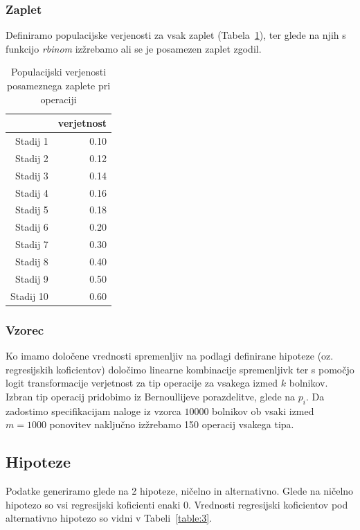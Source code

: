 \documentclass[letterpaper,11pt]{article}
\begin{document}
\subsubsection{Zaplet}
Definiramo populacijske verjenosti za vsak zaplet (Tabela~\ref{table:2}), ter glede na njih s funkcijo \emph{rbinom} izžrebamo ali se je posamezen zaplet zgodil.

\begin{table}[ht]
\centering
\begin{tabular}{rr}
  \hline
 & verjetnost \\ 
  \hline
Stadij 1 & 0.10 \\ 
  Stadij 2 & 0.12 \\ 
  Stadij 3 & 0.14 \\ 
  Stadij 4 & 0.16 \\ 
  Stadij 5 & 0.18 \\ 
  Stadij 6 & 0.20 \\ 
  Stadij 7 & 0.30 \\ 
  Stadij 8 & 0.40 \\ 
  Stadij 9 & 0.50 \\ 
  Stadij 10 & 0.60 \\ 
   \hline
\end{tabular}
\caption{Populacijski verjenosti posameznega zaplete pri operaciji} 
\label{table:2}
\end{table}

\subsubsection{Vzorec}
Ko imamo določene vrednosti spremenljiv na podlagi definirane hipoteze (oz. regresijskih koficientov) določimo linearne kombinacije spremenljivk ter s pomočjo logit transformacije verjetnost za tip operacije za vsakega izmed $k$ bolnikov. Izbran tip operacij pridobimo iz Bernoullijeve porazdelitve, glede na $p_i$. Da zadostimo specifikacijam naloge iz vzorca $10000$ bolnikov ob vsaki izmed $m=1000$ ponovitev naključno izžrebamo 150 operacij vsakega tipa.

\subsection{Hipoteze}
Podatke generiramo glede na 2 hipoteze, ničelno in alternativno. Glede na ničelno hipotezo so vsi regresijski koficienti enaki 0. Vrednosti regresijski koficientov pod alternativno hipotezo so vidni v Tabeli~\ref{table:3}.
\end{document}

